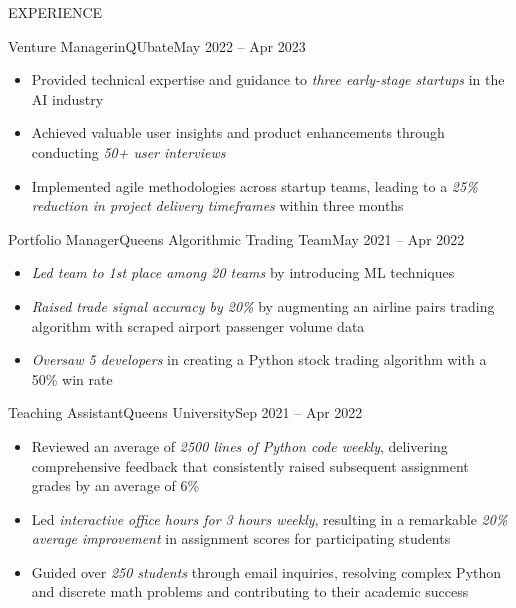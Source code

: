 \documentclass[]{mcdowellcv}
\begin{document}
\begin{cvsection}{EXPERIENCE}
	\begin{cvsubsection}{Venture Manager}{inQUbate}{May 2022 -- Apr 2023}
		\begin{itemize}%
			\item Provided technical expertise and guidance to \textit{three early-stage startups} in the AI industry
			\item Achieved valuable user insights and product enhancements through conducting \textit{50+ user interviews}
			\item Implemented agile methodologies across startup teams, leading to a \textit{25\% reduction in project delivery timeframes} within three months
		\end{itemize}
	\end{cvsubsection}

	\begin{cvsubsection}{Portfolio Manager}{Queen\textquotesingle{}s Algorithmic Trading Team}{May 2021 -- Apr 2022}
		\begin{itemize}%
			\item \textit{Led team to 1st place among 20 teams} by introducing ML techniques
			\item \textit{Raised trade signal accuracy by 20\%} by augmenting an airline pairs trading algorithm with scraped airport passenger volume data
			\item \textit{Oversaw 5 developers} in creating a Python stock trading algorithm with a 50\% win rate
		\end{itemize}
	\end{cvsubsection}

	\begin{cvsubsection}{Teaching Assistant}{Queen\textquotesingle{}s University}{Sep 2021 -- Apr 2022}
		\begin{itemize}%
			\item Reviewed an average of \textit{2500 lines of Python code weekly}, delivering comprehensive feedback that consistently raised subsequent assignment grades by an average of 6\%
			\item Led \textit{interactive office hours for 3 hours weekly}, resulting in a remarkable \textit{20\% average improvement} in assignment scores for participating students
			\item Guided over \textit{250 students} through email inquiries, resolving complex Python and discrete math problems and contributing to their academic success
		\end{itemize}
	\end{cvsubsection}
\end{cvsection}
\end{document}
